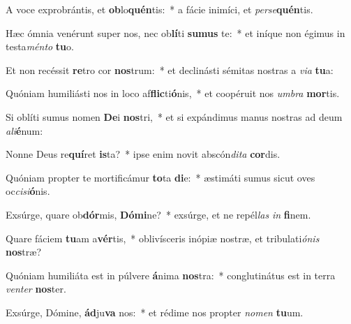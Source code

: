 \item A voce exprobrántis, et \textbf{ob}lo\textbf{quén}tis:~* a fácie inimíci, et \textit{per}\textit{se}\textbf{quén}tis.
\item Hæc ómnia venérunt super nos, nec ob\textbf{lí}ti \textbf{su}\textbf{mus} te:~* et iníque non égimus in testa\textit{mén}\textit{to} \textbf{tu}o.
\item Et non recéssit \textbf{re}tro cor \textbf{nos}trum:~* et declinásti sémitas nostras a \textit{vi}\textit{a} \textbf{tu}a:
\item Quóniam humiliásti nos in loco af\textbf{flic}ti\textbf{ó}nis,~* et coopéruit nos \textit{um}\textit{bra} \textbf{mor}tis.
\item Si oblíti sumus nomen \textbf{De}i \textbf{nos}tri,~* et si expándimus manus nostras ad deum \textit{a}\textit{li}\textbf{é}num:
\item Nonne Deus re\textbf{quí}ret \textbf{is}ta?~* ipse enim novit abscón\textit{di}\textit{ta} \textbf{cor}dis.
\item Quóniam propter te mortificámur \textbf{to}ta \textbf{di}e:~* æstimáti sumus sicut oves oc\textit{ci}\textit{si}\textbf{ó}nis.
\item Exsúrge, quare ob\textbf{dór}mis, \textbf{Dó}\textbf{mi}ne?~* exsúrge, et ne repél\textit{las} \textit{in} \textbf{fi}nem.
\item Quare fáciem \textbf{tu}am a\textbf{vér}tis,~* oblivísceris inópiæ nostræ, et tribulati\textit{ó}\textit{nis} \textbf{nos}træ?
\item Quóniam humiliáta est in púlvere \textbf{á}nima \textbf{nos}tra:~* conglutinátus est in terra \textit{ven}\textit{ter} \textbf{nos}ter.
\item Exsúrge, Dómine, \textbf{ád}ju\textbf{va} nos:~* et rédime nos propter \textit{no}\textit{men} \textbf{tu}um.
